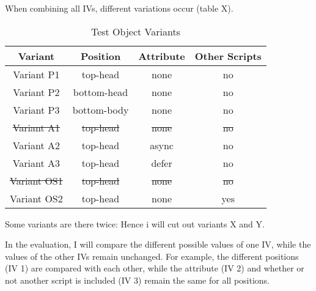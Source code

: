 When combining all IVs, different variations occur (table X).



\begin{table}[h]
	\small
	\centering
	\begin{tabular}{  | c || c | c | c | } 
	\hline
	Variant & Position & Attribute & Other Scripts \\
	\hline \hline
	Variant P1 & top-head & \cellcolor{lightgrey} none & \cellcolor{lightgrey} no \\
	   Variant P2 & bottom-head & \cellcolor{lightgrey} none & \cellcolor{lightgrey} no \\
	   Variant P3 & bottom-body & \cellcolor{lightgrey} none & \cellcolor{lightgrey} no \\
	  \hline
	   \sout{Variant A1} & \cellcolor{lightgrey} \sout{top-head} & \sout{none} & \cellcolor{lightgrey} \sout{no} \\
	   Variant A2 & \cellcolor{lightgrey} top-head & async & \cellcolor{lightgrey} no \\
	   Variant A3 & \cellcolor{lightgrey} top-head & defer & \cellcolor{lightgrey} no \\
	  \hline
	  \sout{Variant OS1} & \cellcolor{lightgrey} \sout{top-head} & \cellcolor{lightgrey} \sout{none} & \sout{no} \\
	  Variant OS2 & \cellcolor{lightgrey} top-head & \cellcolor{lightgrey} none & yes \\
	  \hline
	\end{tabular}
	\medskip
	\caption{Test Object Variants}
	\label{table:test_object_variants}
\end{table}


Some variants are there twice:
Hence i will cut out variants X and Y.



In the evaluation, I will compare the different possible values of one IV, while the values of the other IVs remain unchanged.
For example, the different positions (IV 1) are compared with each other, while the attribute (IV 2) and whether or not another script is included (IV 3) remain the same for all positions.


